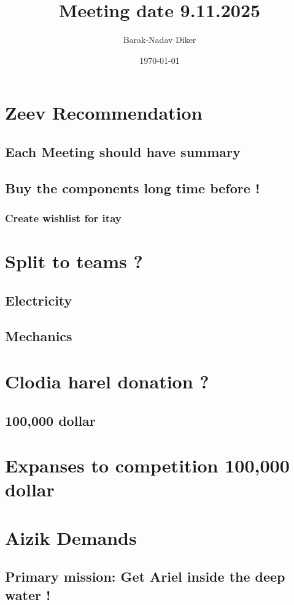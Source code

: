 \documentclass[11pt]{article}
\author{Barak-Nadav Diker}
\date{\today}
\title{Meeting date 9.11.2025}
\begin{document}
\maketitle
\section{Zeev Recommendation}
\label{sec:org1aa7f5b}
\subsection{Each Meeting should have summary}
\label{sec:org1852b2f}
\subsection{Buy the components long time before !}
\label{sec:org8a87f53}
\subsubsection{Create wishlist for itay}
\label{sec:org386c447}
\section{Split to teams ?}
\label{sec:org320ab96}
\subsection{Electricity}
\label{sec:orgb8b7f13}
\subsection{Mechanics}
\label{sec:org7ea3f59}
\section{Clodia harel donation ?}
\label{sec:org9eae4cc}
\subsection{100,000 dollar}
\label{sec:orgd816ce7}
\section{Expanses to competition 100,000 dollar}
\label{sec:orgd76e72c}
\section{Aizik Demands}
\label{sec:org3c4f910}
\subsection{Primary mission: Get Ariel inside the deep water !}
\label{sec:org4cfbb7e}
\end{document}
